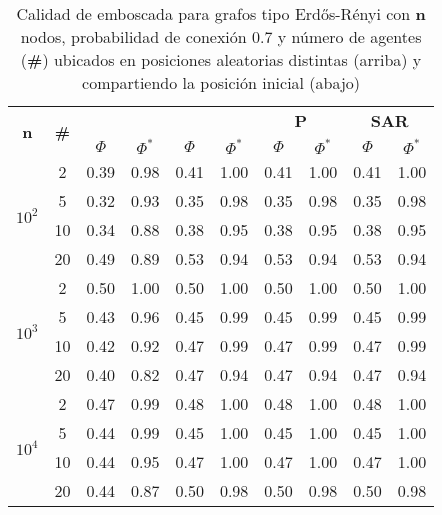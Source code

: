 \begin{table}
	\caption{Calidad de emboscada para grafos tipo Erd\H{o}s-R{\'e}nyi
	con \textbf{n} nodos, probabilidad de conexi\'on 0.7 y n\'umero de agentes
	(\textbf{\#}) ubicados en posiciones aleatorias distintas (arriba) y
	compartiendo la posici\'on inicial (abajo)}
	\label{tab:ambush_er}
	\centering
	\begin{small}
		\setlength{\tabcolsep}{4pt}
		\begin{tabular}{|c|c|cc|cc|cc|cc|}
			\hline
			\multirow{2}{*}{\textbf{n}} &
			\multirow{2}{*}{\textbf{\#}} &
			\multicolumn{2}{c|}{\textbf{\astar}} &
			\multicolumn{2}{c|}{\textbf{\ambush}} &
			\multicolumn{2}{c|}{\textbf{P}} &
			\multicolumn{2}{c|}{\textbf{SAR}}\\
			& & $\Phi$ & $\Phi^*$ & $\Phi$ & $\Phi^*$&
			$\Phi$ & $\Phi^*$& $\Phi$ & $\Phi^*$\\
			\hline
			\multirow{4}{*}{$10^2$}
			 & 2 & 0.39 & 0.98 & 0.41 & 1.00 & 0.41 & 1.00 & 0.41 & 1.00\\
			 & 5 & 0.32 & 0.93 & 0.35 & 0.98 & 0.35 & 0.98 & 0.35 & 0.98\\
			 & 10 & 0.34 & 0.88 & 0.38 & 0.95 & 0.38 & 0.95 & 0.38 & 0.95\\
			 & 20 & 0.49 & 0.89 & 0.53 & 0.94 & 0.53 & 0.94 & 0.53 & 0.94\\
			\hline
			\multirow{4}{*}{$10^3$}
			 & 2 & 0.50 & 1.00 & 0.50 & 1.00 & 0.50 & 1.00 & 0.50 & 1.00\\
			 & 5 & 0.43 & 0.96 & 0.45 & 0.99 & 0.45 & 0.99 & 0.45 & 0.99\\
			 & 10 & 0.42 & 0.92 & 0.47 & 0.99 & 0.47 & 0.99 & 0.47 & 0.99\\
			 & 20 & 0.40 & 0.82 & 0.47 & 0.94 & 0.47 & 0.94 & 0.47 & 0.94\\
			 \hline
			\multirow{4}{*}{$10^4$}
			 & 2 & 0.47 & 0.99 & 0.48 & 1.00 & 0.48 & 1.00 & 0.48 & 1.00\\
			 & 5 & 0.44 & 0.99 & 0.45 & 1.00 & 0.45 & 1.00 & 0.45 & 1.00\\
			 & 10 & 0.44 & 0.95 & 0.47 & 1.00 & 0.47 & 1.00 & 0.47 & 1.00\\
			 & 20 & 0.44 & 0.87 & 0.50 & 0.98 & 0.50 & 0.98 & 0.50 & 0.98\\
			 \hline
		\end{tabular}
		

\end{small}
\end{table}
